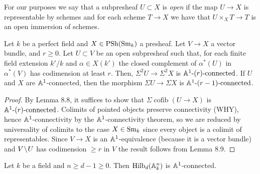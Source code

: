 \documentclass[12pt]{article}
\DeclareMathOperator{\cofib}{\mathrm{cofib}}
\begin{document}
\begin{rmk}
For our purposes we say that a subpresheaf $U \subset X$ is \textit{open} if the map $U \to X$ is representable by schemes and for each scheme $T \to X$ we have that $U \times_X T \to T$ is an open immersion of schemes.
\end{rmk}

\begin{prop}[8.10]
Let $k$ be a perfect field and $X \in \mathrm{PSh}(\mathrm{Sm}_k)$ a presheaf. Let $V \to X$ a vector bundle, and $r \ge 0$. Let $U \subset V$ be an open subpresheaf such that, for each finite field extension $k'/k$ and $\alpha \in X(k')$ the closed complement of $\alpha^*(U)$ in $\alpha^*(V)$ has codimension at least $r$. Then, $\Sigma^2 U \to \Sigma^2 X$ is $\mathbb{A}^1\text{-}(r)\text{-connected}$. If $U$ and $X$ are $\mathbb{A}^1$-connected, then the morphism $\Sigma U \to \Sigma X$ is $\mathbb{A}^1\text{-}(r-1)\text{-connected}$.
\end{prop}

\begin{proof}
By Lemma 8.8, it suffices to show that $\Sigma \cofib(U \to X)$ is $\mathbb{A}^1\text{-}(r)\text{-connected}$. Colimits of pointed objects preserve connectivity (WHY), hence $\mathbb{A}^1$-connectivity by the $\mathbb{A}^1$-connectivity theorem, so we are reduced by universality of colimits to the case $X \in \mathrm{Sm}_k$ since every object is a colimit of representables. Since $V \to X$ is an $\mathbb{A}^1$-equivalence (because it is a vector bundle) and $V \! \setminus \! U$ has codimension $\ge r$ in $V$ the result follows from Lemma 8.9. 
\end{proof}

\begin{lemma}[8.11]
Let $k$ be a field and $n \ge d - 1 \ge 0$. Then $\mathrm{Hilb}_d(\mathbb{A}^n_k)$ is $\mathbb{A}^1$-connected.
\end{lemma}
\end{document}

